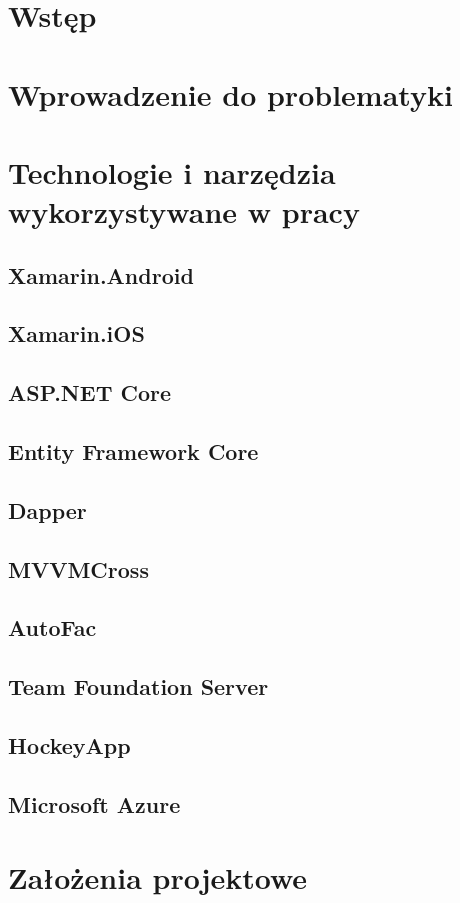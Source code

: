 \chapter*{Wstęp}
\chapter{Wprowadzenie do problematyki}
\chapter{Technologie i narzędzia wykorzystywane w pracy}
\section{Xamarin.Android}
\section{Xamarin.iOS}
\section{ASP.NET Core}
\section{Entity Framework Core}
\section{Dapper}
\section{MVVMCross}
\section{AutoFac}
\section{Team Foundation Server}
\section{HockeyApp}
\section{Microsoft Azure}
\chapter{Założenia projektowe}
